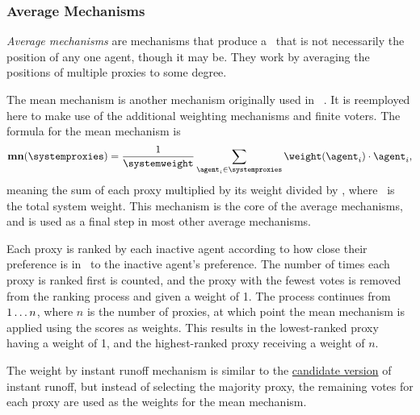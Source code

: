 \subsubsection{Average Mechanisms}\label{subsubsec:average-mechanisms}
\textit{Average mechanisms} are mechanisms that produce a \systemtruth\ that
is not necessarily the position of any one agent, though it may be.
They work by averaging the positions of multiple proxies to some degree.

\label{para:mean}
The mean mechanism is another mechanism originally used in
~\cite{Cohensius2017}.
It is reemployed here to make use of the additional weighting mechanisms and
finite voters.
The formula for the mean mechanism is
\begin{equation*}
    \mathbf{mn}(\systemproxies) =
    \frac{1}{\systemweight}
    \sum_{\agent_i \in \systemproxies} {\weightof{\agent_i} \cdot \agent_i}
    \text{,}\label{eq:mean-mechanism}
\end{equation*}
meaning the sum of each proxy multiplied by its weight divided by
\systemweight, where \systemweight\ is the total system weight.
This mechanism is the core of the average mechanisms, and is used as a final
step in most other average mechanisms.

\label{para:avg-ranked-choice}
Each proxy is ranked by each inactive agent according to how close their preference
is in \systemspace\ to the inactive agent's preference.
The number of times each proxy is ranked first is counted, and the proxy with
the fewest votes is removed from the ranking process and given a weight of 1.
The process continues from $1 \mathellipsis n$, where $n$ is the number of
proxies, at which point the mean mechanism is applied using the scores as
weights.
This results in the lowest-ranked proxy having a weight of 1, and the
highest-ranked proxy receiving a weight of $n$.

\label{para:avg-instant-runoff}
The weight by instant runoff mechanism is similar to the
\hyperref[para:cand-instant-runoff]{candidate version} of instant
runoff, but instead of selecting the majority proxy, the remaining votes for
each proxy are used as the weights for the mean mechanism.

